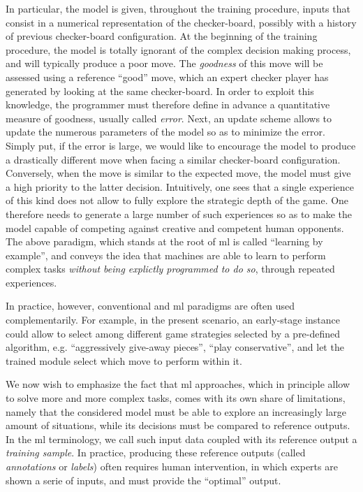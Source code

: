 In particular, the model is given, throughout the training procedure, inputs that consist in a numerical representation of the checker-board, possibly with a history of previous checker-board configuration.
At the beginning of the training procedure, the model is totally ignorant of the complex decision making process, and will typically produce a poor move.
The \textit{goodness} of this move will be assessed using a reference ``good'' move, which an expert checker player has generated by looking at the same checker-board.
In order to exploit this knowledge, the programmer must therefore define in advance a quantitative measure of goodness, usually called \textit{error}.
Next, an update scheme allows to update the numerous parameters of the model so as to minimize the error.
Simply put, if the error is large, we would like to encourage the model to produce a drastically different move when facing a similar checker-board configuration.
Conversely, when the move is similar to the expected move, the model must give a high priority to the latter decision.
Intuitively, one sees that a single experience of this kind does not allow to fully explore the strategic depth of the game.
One therefore needs to generate a large number of such experiences so as to make the model capable of competing against creative and competent human opponents.
The above paradigm, which stands at the root of \gls{ml} is called ``learning by example'', and conveys the idea that machines are able to learn to perform complex tasks \textit{without being explictly programmed to do so}, through repeated experiences.

In practice, however, conventional and \gls{ml} paradigms are often used complementarily.
For example, in the present scenario, an early-stage instance could allow to select among different game strategies selected by a pre-defined algorithm, e.g. ``aggressively give-away pieces'', ``play conservative'', and let the trained module select which move to perform within it.

We now wish to emphasize the fact that \gls{ml} approaches, which in principle allow to solve more and more complex tasks, comes with its own share of limitations, namely that the considered model must be able to explore an increasingly large amount of situations, while its decisions must be compared to reference outputs.
In the \gls{ml} terminology, we call such input data coupled with its reference output a \textit{training sample}.
In practice, producing these reference outputs (called \textit{annotations} or \textit{labels}) often requires human intervention, in which experts
are shown a serie of inputs, and must provide the ``optimal'' output.

